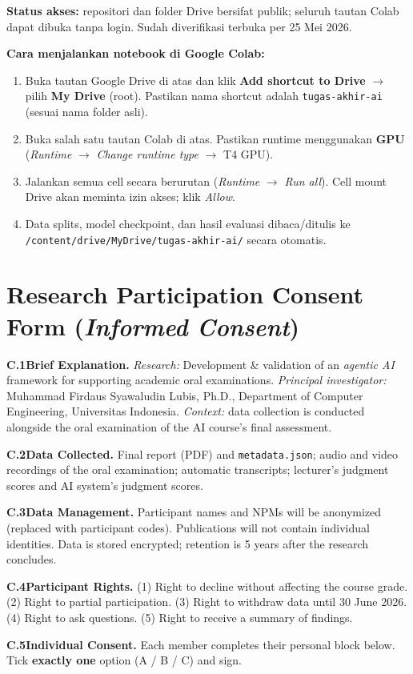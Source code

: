 \documentclass[11pt,a4paper,oneside]{report}
\renewcommand{\appendixname}{LAMPIRAN}
\begin{document}
\textbf{Status akses:} repositori dan folder Drive bersifat publik; seluruh tautan Colab dapat dibuka tanpa login. Sudah diverifikasi terbuka per 25 Mei 2026.

\vspace{0.8em}
\noindent\textbf{Cara menjalankan notebook di Google Colab:}
\begin{enumerate}[leftmargin=*, itemsep=0.2em]
    \item Buka tautan Google Drive di atas dan klik \textbf{Add shortcut to Drive} $\to$ pilih \textbf{My Drive} (root). Pastikan nama shortcut adalah \texttt{tugas-akhir-ai} (sesuai nama folder asli).
    \item Buka salah satu tautan Colab di atas. Pastikan runtime menggunakan \textbf{GPU} (\textit{Runtime} $\to$ \textit{Change runtime type} $\to$ T4 GPU).
    \item Jalankan semua cell secara berurutan (\textit{Runtime} $\to$ \textit{Run all}). Cell mount Drive akan meminta izin akses; klik \textit{Allow}.
    \item Data splits, model checkpoint, dan hasil evaluasi dibaca/ditulis ke \texttt{/content/drive/MyDrive/tugas-akhir-ai/} secara otomatis.
\end{enumerate}

\renewcommand{\appendixname}{APPENDIX}

\chapter{Research Participation Consent Form (\textit{Informed Consent})}
\label{lamp:consent}

{\small
\textbf{C.1\quad Brief Explanation.}
\textit{Research:} Development \& validation of an \textit{agentic AI} framework for supporting academic oral examinations.
\textit{Principal investigator:} Muhammad Firdaus Syawaludin Lubis, Ph.D., Department of Computer Engineering, Universitas Indonesia.
\textit{Context:} data collection is conducted alongside the oral examination of the AI course's final assessment.

\textbf{C.2\quad Data Collected.}
Final report (PDF) and \texttt{metadata.json}; audio and video recordings of the oral examination; automatic transcripts; lecturer's judgment scores and AI system's judgment scores.

\textbf{C.3\quad Data Management.}
Participant names and NPMs will be anonymized (replaced with participant codes). Publications will not contain individual identities. Data is stored encrypted; retention is 5 years after the research concludes.

\textbf{C.4\quad Participant Rights.}
(1) Right to decline without affecting the course grade. (2) Right to partial participation. (3) Right to withdraw data until 30 June 2026. (4) Right to ask questions. (5) Right to receive a summary of findings.

\textbf{C.5\quad Individual Consent.}
Each member completes their personal block below. Tick \textbf{exactly one} option (A / B / C) and sign.
}
\end{document}
